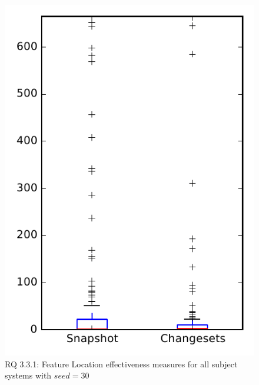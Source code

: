 
\begin{figure}
\centering
\includegraphics[height=0.4\textheight]{figures/flt_seed/rq1_overview_30}
\caption{RQ 3.3.1: Feature Location effectiveness measures for all subject systems with $seed=30$}
\label{fig:flt_seed:rq1:overview}
\end{figure}
